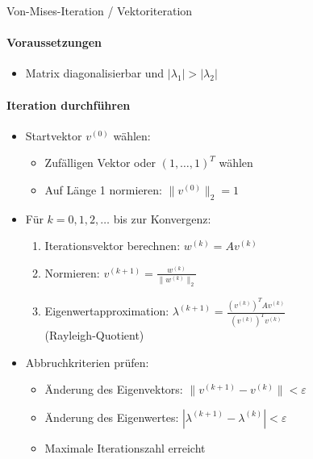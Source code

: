 \begin{KR}{Von-Mises-Iteration / Vektoriteration}
\paragraph{Voraussetzungen}
\begin{itemize}
    \item Matrix diagonalisierbar und $|\lambda_1| > |\lambda_2|$
\end{itemize}

\paragraph{Iteration durchführen}
\begin{itemize}
    \item Startvektor $v^{(0)}$ wählen:
    \begin{itemize}
        \item Zufälligen Vektor oder $(1,\ldots,1)^T$ wählen
        \item Auf Länge 1 normieren: $\|v^{(0)}\|_2 = 1$
    \end{itemize}

    \item Für $k = 0,1,2,\ldots$ bis zur Konvergenz:
    \vspace{1mm}
    \begin{enumerate}
        \item Iterationsvektor berechnen: $w^{(k)} = Av^{(k)}$
        \vspace{1mm}
        \item Normieren: $v^{(k+1)} = \frac{w^{(k)}}{\|w^{(k)}\|_2}$
        \vspace{1mm}
        \item Eigenwertapproximation:
              $\lambda^{(k+1)} = \frac{(v^{(k)})^TAv^{(k)}}{(v^{(k)})^Tv^{(k)}}$\\
              (Rayleigh-Quotient)
        \end{enumerate}
        \vspace{1mm}
    

    \item Abbruchkriterien prüfen:
    \begin{itemize}
        \item Änderung des Eigenvektors: $\|v^{(k+1)} - v^{(k)}\| < \varepsilon$
        \item Änderung des Eigenwertes: $|\lambda^{(k+1)} - \lambda^{(k)}| < \varepsilon$
        \item Maximale Iterationszahl erreicht
    \end{itemize}


\end{itemize}
\end{KR}
